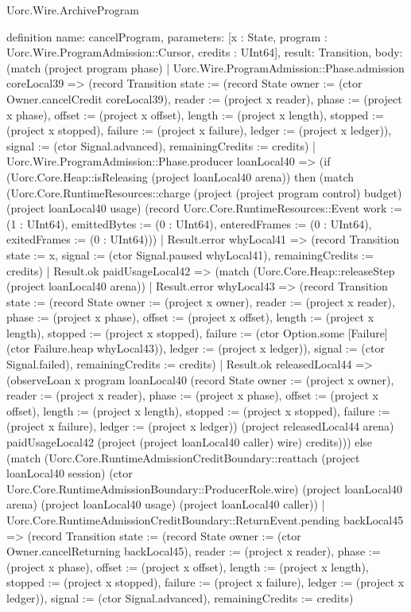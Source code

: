 \begin{lexlean}{Uorc.Wire.ArchiveProgram}
\begin{semanticmodule}
definition{
  name: cancelProgram,
  parameters: [x : State, program : Uorc.Wire.ProgramAdmission::Cursor, credits : UInt64],
  result: Transition,
  body: (match (project program phase)
    | Uorc.Wire.ProgramAdmission::Phase.admission coreLocal39 => (record Transition {state := (record State {owner := (ctor Owner.cancelCredit coreLocal39), reader := (project x reader), phase := (project x phase), offset := (project x offset), length := (project x length), stopped := (project x stopped), failure := (project x failure), ledger := (project x ledger)}), signal := (ctor Signal.advanced), remainingCredits := credits})
    | Uorc.Wire.ProgramAdmission::Phase.producer loanLocal40 => (if (Uorc.Core.Heap::isReleasing (project loanLocal40 arena)) then (match (Uorc.Core.RuntimeResources::charge (project (project program control) budget) (project loanLocal40 usage) (record Uorc.Core.RuntimeResources::Event {work := (1 : UInt64), emittedBytes := (0 : UInt64), enteredFrames := (0 : UInt64), exitedFrames := (0 : UInt64)}))
      | Result.error whyLocal41 => (record Transition {state := x, signal := (ctor Signal.paused whyLocal41), remainingCredits := credits})
      | Result.ok paidUsageLocal42 => (match (Uorc.Core.Heap::releaseStep (project loanLocal40 arena))
        | Result.error whyLocal43 => (record Transition {state := (record State {owner := (project x owner), reader := (project x reader), phase := (project x phase), offset := (project x offset), length := (project x length), stopped := (project x stopped), failure := (ctor Option.some [Failure] (ctor Failure.heap whyLocal43)), ledger := (project x ledger)}), signal := (ctor Signal.failed), remainingCredits := credits})
        | Result.ok releasedLocal44 => (observeLoan x program loanLocal40 (record State {owner := (project x owner), reader := (project x reader), phase := (project x phase), offset := (project x offset), length := (project x length), stopped := (project x stopped), failure := (project x failure), ledger := (project x ledger)}) (project releasedLocal44 arena) paidUsageLocal42 (project (project loanLocal40 caller) wire) credits))) else (match (Uorc.Core.RuntimeAdmissionCreditBoundary::reattach (project loanLocal40 session) (ctor Uorc.Core.RuntimeAdmissionBoundary::ProducerRole.wire) (project loanLocal40 arena) (project loanLocal40 usage) (project loanLocal40 caller))
      | Uorc.Core.RuntimeAdmissionCreditBoundary::ReturnEvent.pending backLocal45 => (record Transition {state := (record State {owner := (ctor Owner.cancelReturning backLocal45), reader := (project x reader), phase := (project x phase), offset := (project x offset), length := (project x length), stopped := (project x stopped), failure := (project x failure), ledger := (project x ledger)}), signal := (ctor Signal.advanced), remainingCredits := credits})
}
\end{semanticmodule}
\end{lexlean}
